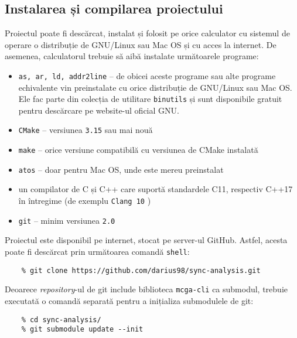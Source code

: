 \subsection{Instalarea și compilarea proiectului}
Proiectul poate fi descărcat, instalat și folosit pe orice calculator cu
sistemul de operare o distribuție de GNU/Linux sau Mac OS și cu acces
la internet. De asemenea, calculatorul trebuie să aibă instalate
următoarele programe:
\begin{itemize}
    \item \lstinline{as, ar, ld, addr2line} -- de obicei aceste programe
    sau alte programe echivalente vin preinstalate cu orice distribuție
    de GNU/Linux sau Mac OS. Ele fac parte din colecția de utilitare
    \lstinline{binutils}\cite{binutils} și sunt disponibile gratuit
    pentru descărcare pe website-ul oficial GNU\cite{GNUWebsite}.
    \item \lstinline{CMake}\cite{CMake} -- versiunea \lstinline{3.15}
    sau mai nouă
    \item \lstinline{make} -- orice versiune compatibilă cu versiunea de
    CMake instalată
    \item \lstinline{atos}\cite{atos} -- doar pentru Mac OS, unde este
    mereu preinstalat
    \item un compilator de C și C++ care suportă standardele C11,
    respectiv C++17 în întregime (de exemplu \lstinline{Clang 10}
    \cite{Clang})
    \item \lstinline{git}\cite{git} -- minim versiunea \lstinline{2.0}
\end{itemize}

Proiectul este disponibil pe internet, stocat pe server-ul GitHub.
Astfel, acesta poate fi descărcat prin următoarea comandă
\lstinline{shell}:

\begin{minipage}{\linewidth}
\begin{lstlisting}
    % git clone https://github.com/darius98/sync-analysis.git
\end{lstlisting}
\end{minipage}

Deoarece \textit{repository}-ul de git include biblioteca
\lstinline{mcga-cli}\cite{mcga-cli} ca submodul, trebuie executată o
comandă separată pentru a inițializa submodulele de git:

\begin{minipage}{\linewidth}
\begin{lstlisting}
    % cd sync-analysis/
    % git submodule update --init
\end{lstlisting}
\end{minipage}

